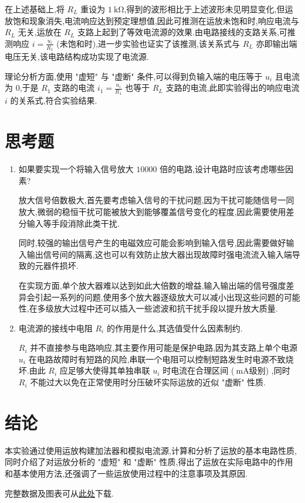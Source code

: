         在上述基础上,将 $R_{L}$ 重设为 $1 \ \mathrm{k\Omega}$,得到的波形相比于上述波形未见明显变化,但运放饱和现象消失,电流响应达到预定理想值,因此可推测在运放未饱和时,响应电流与 $R_{L}$ 无关,运放在 $R_{L}$ 支路上起到了等效电流源的效果.由电路接线的支路关系,可推测响应 $i=\frac{u_{i}}{R_1}$ (未饱和时),进一步实验也证实了该推测,该关系式与 $R_{L}$ 亦即输出端电压无关,该电路结构成功实现了电流源.

        理论分析方面,使用 "虚短" 与 "虚断" 条件,可以得到负输入端的电压等于 $u_{i}$ 且电流为 $0$,于是 $R_1$ 支路的电流 $i_1=\frac{u_{i}}{R_1}$ 也等于 $R_{L}$ 支路的电流,此即实验得出的响应电流 $i$ 的关系式,符合实验结果.
    \section{思考题}
        \begin{enumerate}
            \item 如果要实现一个将输入信号放大 $10000$ 倍的电路,设计电路时应该考虑哪些因素?

                放大信号倍数极大,首先要考虑输入信号的干扰问题,因为干扰可能随信号一同放大,微弱的稳恒干扰可能被放大到能够覆盖信号变化的程度,因此需要使用差分输入等手段消除此类干扰.

                同时,较强的输出信号产生的电磁效应可能会影响到输入信号,因此需要做好输入输出信号间的隔离,这也可以有效防止放大器出现故障时强电流流入输入端导致的元器件损坏.

                在实现方面,单个放大器难以达到如此大倍数的增益,输入输出端的信号强度差异会引起一系列的问题,使用多个放大器逐级放大可以减小出现这些问题的可能性,在多级放大过程中还可以插入一些滤波和抗干扰手段以提升放大质量.
            \item 电流源的接线中电阻 $R_{i}$ 的作用是什么,其选值受什么因素制约.

                $R_{i}$ 并不直接参与电路响应,其主要作用可能是保护电路,因为其支路上单个电源 $u_{i}$ 在电路故障时有短路的风险,串联一个电阻可以控制短路发生时电源不致烧坏.由此 $R_{i}$ 应足够大使得其单独串联 $u_{i}$ 时电流在合理区间 ($\ \mathrm{mA}$级别) ,同时 $R_{i}$ 不能过大以免在正常使用时分压破坏实际运放的近似 "虚断" 性质.
        \end{enumerate}
    \section{结论}
        本实验通过使用运放构建加法器和模拟电流源,计算和分析了运放的基本电路性质,同时介绍了对运放分析的 "虚短" 和 "虚断" 性质,得出了运放在实际电路中的作用和基本使用方法,还强调了一些运放使用过程中的注意事项及其原因.

        完整数据及图表可从\href{https://cloud.tsinghua.edu.cn/d/14cb134a3c584fa28f73/}{此处}下载.

